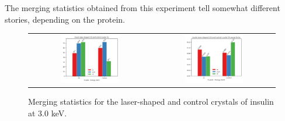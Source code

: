 The merging statistics obtained from this experiment tell somewhat different stories, depending on the protein. 

\begin{figure}[h]
    \centering
    \begin{tabular}{cc}
    \includegraphics[width = 0.5\textwidth]{plots/exp2/ins_I_over_sigma.png} & \includegraphics[width = 0.5\textwidth]{plots/exp2/ins_rmerges.png}
    \end{tabular}
    \caption{Merging statistics for the laser-shaped and control crystals of insulin at 3.0 \unit{keV}.}
    \label{fig:insulin}
\end{figure}

